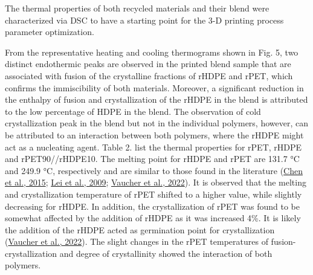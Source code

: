 \documentclass[
  12pt,
  number,
  review]{elsarticle}
\begin{document}
The thermal properties of both recycled materials and their blend were
characterized via DSC to have a starting point for the 3-D printing
process parameter optimization.

From the representative heating and cooling thermograms shown in Fig. 5,
two distinct endothermic peaks are observed in the printed blend sample
that are associated with fusion of the crystalline fractions of rHDPE
and rPET, which confirms the immiscibility of both materials. Moreover,
a significant reduction in the enthalpy of fusion and crystallization of
the rHDPE in the blend is attributed to the low percentage of HDPE in
the blend. The observation of cold crystallization peak in the blend but
not in the individual polymers, however, can be attributed to an
interaction between both polymers, where the rHDPE might act as a
nucleating agent. Table 2. list the thermal properties for rPET, rHDPE
and rPET90//rHDPE10. The melting point for rHDPE and rPET are 131.7 °C
and 249.9 °C, respectively and are similar to those found in the
literature (\protect\hyperlink{ref-chen2015}{Chen et al., 2015};
\protect\hyperlink{ref-lei2009}{Lei et al., 2009};
\protect\hyperlink{ref-vaucher2022}{Vaucher et al., 2022}). It is
observed that the melting and crystallization temperature of rPET
shifted to a higher value, while slightly decreasing for rHDPE. In
addition, the crystallization of rPET was found to be somewhat affected
by the addition of rHDPE as it was increased 4\%. It is likely the
addition of the rHDPE acted as germination point for crystallization
(\protect\hyperlink{ref-vaucher2022}{Vaucher et al., 2022}). The slight
changes in the rPET temperatures of fusion-crystallization and degree of
crystallinity showed the interaction of both polymers.
\end{document}
